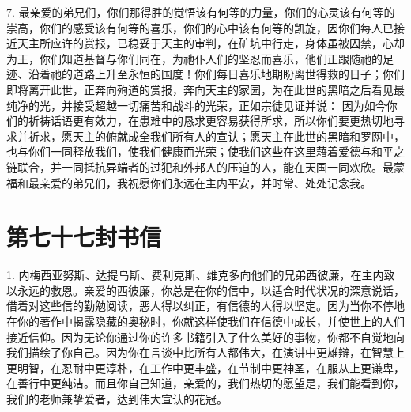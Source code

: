 7. 最亲爱的弟兄们，你们那得胜的觉悟该有何等的力量，你们的心灵该有何等的崇高，你们的感受该有何等的喜乐，你们的心中该有何等的凯旋，因你们每人已接近天主所应许的赏报，已稳妥于天主的审判，在矿坑中行走，身体虽被囚禁，心却为王，你们知道基督与你们同在，为祂仆人们的坚忍而喜乐，他们正跟随祂的足迹、沿着祂的道路上升至永恒的国度！你们每日喜乐地期盼离世得救的日子；你们即将离开此世，正奔向殉道的赏报，奔向天主的家园，为在此世的黑暗之后看见最纯净的光，并接受超越一切痛苦和战斗的光荣，正如宗徒见证并说： 因为如今你们的祈祷话语更有效力，在患难中的恳求更容易获得所求，所以你们要更热切地寻求并祈求，愿天主的俯就成全我们所有人的宣认；愿天主在此世的黑暗和罗网中，也与你们一同释放我们，使我们健康而光荣；使我们这些在这里藉着爱德与和平之链联合，并一同抵抗异端者的过犯和外邦人的压迫的人，能在天国一同欢欣。最蒙福和最亲爱的弟兄们，我祝愿你们永远在主内平安，并时常、处处记念我。\par



\section{第七十七封书信}

\par

\par

1. 内梅西亚努斯、达提乌斯、费利克斯、维克多向他们的兄弟西彼廉，在主内致以永远的救恩。亲爱的西彼廉，你总是在你的信中，以适合时代状况的深意说话，借着对这些信的勤勉阅读，恶人得以纠正，有信德的人得以坚定。因为当你不停地在你的著作中揭露隐藏的奥秘时，你就这样使我们在信德中成长，并使世上的人们接近信仰。因为无论你通过你的许多书籍引入了什么美好的事物，你都不自觉地向我们描绘了你自己。因为你在言谈中比所有人都伟大，在演讲中更雄辩，在智慧上更明智，在忍耐中更淳朴，在工作中更丰盛，在节制中更神圣，在服从上更谦卑，在善行中更纯洁。而且你自己知道，亲爱的，我们热切的愿望是，我们能看到你，我们的老师兼挚爱者，达到伟大宣认的花冠。\par

